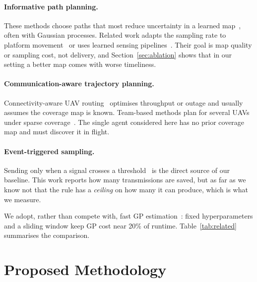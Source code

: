 \documentclass[pdflatex,sn-mathphys-num,iicol]{sn-jnl}
\theoremstyle{thmstyleone}
\theoremstyle{thmstyletwo}
\theoremstyle{thmstylethree}
\begin{document}
\paragraph{Informative path planning.} These methods choose paths that most reduce
uncertainty in a learned map~\cite{maAdaptiveInformativePath2025,
blanchardInformativePathPlanning2022}, often with Gaussian processes. Related work adapts
the sampling rate to platform movement~\cite{hanMobilityentropyawareAdaptiveUWB2026} or
uses learned sensing pipelines~\cite{calistiDeepLearningdrivenSensing2026}. Their goal is
map quality or sampling cost, not delivery, and Section~\ref{sec:ablation} shows that in
our setting a better map comes with worse timeliness.

\paragraph{Communication-aware trajectory planning.} Connectivity-aware UAV
routing~\cite{mardaniCommunicationAwareUAVPath2019, chuTrajectoryOptimizationResource2026,
hayatMultiobjectiveDronePath2020} optimises throughput or outage and usually assumes the
coverage map is known. Team-based methods plan for several UAVs under sparse
coverage~\cite{conceicaoPathPlanningOptimisation2026, liuTrajectoryPlanningTracking2026}.
The single agent considered here has no prior coverage map and must discover it in
flight.

\paragraph{Event-triggered sampling.} Sending only when a signal crosses a
threshold~\cite{hakandurakEfficientEventBasedSampling2026} is the direct source of our
baseline. This work reports how many transmissions are saved, but as far as we know not
that the rule has a \emph{ceiling} on how many it can produce, which is what we measure.

We adopt, rather than compete with, fast GP estimation~\cite{munozGaussianProcessesFast2023}:
fixed hyperparameters and a sliding window keep GP cost near 20\% of runtime.
Table~\ref{tab:related} summarises the comparison.

\section{Proposed Methodology}\label{sec:method}
\end{document}
